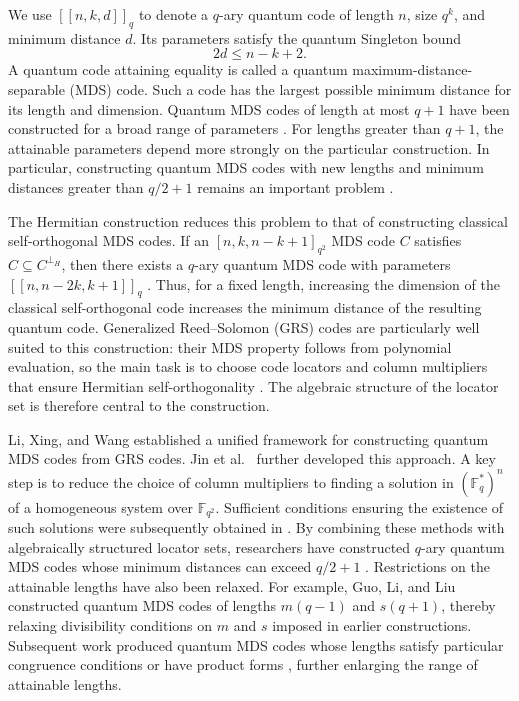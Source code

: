 \documentclass[preprint,12pt,a4paper]{elsarticle}
\newcommand{\qcode}[3]{\left[\!\left[#1,#2,#3\right]\!\right]_q}
\begin{document}
We use $\qcode{n}{k}{d}$ to denote a $q$-ary quantum code of length $n$, size $q^k$, and minimum distance $d$. Its parameters satisfy the quantum Singleton bound \cite{KetkarEtAl2006}
\begin{equation}\label{eq:intro-singleton}
 2d\le n-k+2.
\end{equation}
A quantum code attaining equality is called a quantum maximum-distance-separable (MDS) code. Such a code has the largest possible minimum distance for its length and dimension. Quantum MDS codes of length at most $q+1$ have been constructed for a broad range of parameters \cite{GrasslBethRoetteler2004,JinXing2014}. For lengths greater than $q+1$, the attainable parameters depend more strongly on the particular construction. In particular, constructing quantum MDS codes with new lengths and minimum distances greater than $q/2+1$ remains an important problem \cite{FangFu2018,GuoLiLiu2021,WanZhengZhu2025}.

The Hermitian construction reduces this problem to that of constructing classical self-orthogonal MDS codes. If an $[n,k,n-k+1]_{q^2}$ MDS code $C$ satisfies $C\subseteq C^{\perp_H}$, then there exists a $q$-ary quantum MDS code with parameters $\qcode{n}{n-2k}{k+1}$ \cite{AshikhminKnill2001,KetkarEtAl2006}. Thus, for a fixed length, increasing the dimension of the classical self-orthogonal code increases the minimum distance of the resulting quantum code. Generalized Reed--Solomon (GRS) codes are particularly well suited to this construction: their MDS property follows from polynomial evaluation, so the main task is to choose code locators and column multipliers that ensure Hermitian self-orthogonality \cite{MacWilliamsSloane1977}. The algebraic structure of the locator set is therefore central to the construction.

Li, Xing, and Wang \cite{LiXingWang2008} established a unified framework for constructing quantum MDS codes from GRS codes. Jin et al.\ \cite{JinLingLuoXing2010,JinXing2014} further developed this approach. A key step is to reduce the choice of column multipliers to finding a solution in $(\mathbb F_q^{*})^n$ of a homogeneous system over $\mathbb F_{q^2}$. Sufficient conditions ensuring the existence of such solutions were subsequently obtained in \cite{WanZhengZhu2025}. By combining these methods with algebraically structured locator sets, researchers have constructed $q$-ary quantum MDS codes whose minimum distances can exceed $q/2+1$ \cite{FangFu2018,FangFu2019}. Restrictions on the attainable lengths have also been relaxed. For example, Guo, Li, and Liu \cite{GuoLiLiu2021} constructed quantum MDS codes of lengths $m(q-1)$ and $s(q+1)$, thereby relaxing divisibility conditions on $m$ and $s$ imposed in earlier constructions. Subsequent work produced quantum MDS codes whose lengths satisfy particular congruence conditions \cite{WanLianZhu2025} or have product forms \cite{CampionHernandoMcGuire2025}, further enlarging the range of attainable lengths.
\end{document}

